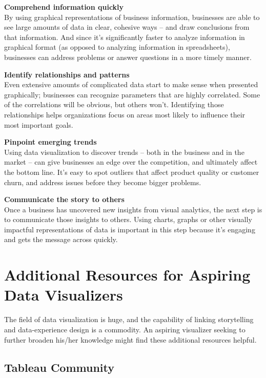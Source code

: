 \documentclass[]{book}
\begin{document}
\textbf{Comprehend information quickly}\\
By using graphical representations of business information, businesses are able to see large amounts of data in clear, cohesive ways -- and draw conclusions from that information. And since it's significantly faster to analyze information in graphical format (as opposed to analyzing information in spreadsheets), businesses can address problems or answer questions in a more timely manner.

\textbf{Identify relationships and patterns}\\
Even extensive amounts of complicated data start to make sense when presented graphically; businesses can recognize parameters that are highly correlated. Some of the correlations will be obvious, but others won't. Identifying those relationships helps organizations focus on areas most likely to influence their most important goals.

\textbf{Pinpoint emerging trends}\\
Using data visualization to discover trends -- both in the business and in the market -- can give businesses an edge over the competition, and ultimately affect the bottom line. It's easy to spot outliers that affect product quality or customer churn, and address issues before they become bigger problems.

\textbf{Communicate the story to others}\\
Once a business has uncovered new insights from visual analytics, the next step is to communicate those insights to others. Using charts, graphs or other visually impactful representations of data is important in this step because it's engaging and gets the message across quickly.

\hypertarget{additional-resources-for-aspiring-data-visualizers}{%
\section{Additional Resources for Aspiring Data Visualizers}\label{additional-resources-for-aspiring-data-visualizers}}

The field of data visualization is huge, and the capability of linking storytelling and data-experience design is a commodity. An aspiring visualizer seeking to further broaden his/her knowledge might find these additional resources helpful.

\hypertarget{tableau-community-1}{%
\subsection{Tableau Community}\label{tableau-community-1}}
\end{document}
